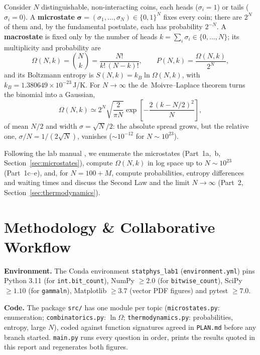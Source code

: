 \documentclass[11pt,a4paper]{article}
\begin{document}
Consider $N$ distinguishable, non-interacting coins, each heads ($\sigma_i=1$) or tails ($\sigma_i=0$). A \textbf{microstate} $\bm{\sigma}=(\sigma_1,\dots,\sigma_N)\in\{0,1\}^N$ fixes every coin; there are $2^N$ of them and, by the fundamental postulate, each has probability $2^{-N}$. A \textbf{macrostate} is fixed only by the number of heads $k=\sum_i\sigma_i\in\{0,\dots,N\}$; its multiplicity and probability are
\begin{equation}
    \Omega(N,k)=\binom{N}{k}=\frac{N!}{k!\,(N-k)!},\qquad P(N,k)=\frac{\Omega(N,k)}{2^N},
    \label{eq:binomial_multiplicity}
\end{equation}
and its Boltzmann entropy is $S(N,k)=k_B\ln\Omega(N,k)$, with $k_B=1.380649\times10^{-23}$\,J/K. For $N\to\infty$ the de~Moivre--Laplace theorem turns the binomial into a Gaussian,
\begin{equation}
    \Omega(N,k)\simeq2^N\sqrt{\frac{2}{\pi N}}\exp\!\left[-\frac{2\,(k-N/2)^2}{N}\right],
    \label{eq:gaussian_limit}
\end{equation}
of mean $N/2$ and width $\sigma=\sqrt N/2$: the absolute spread grows, but the relative one, $\sigma/N=1/(2\sqrt N)$, vanishes ($\sim10^{-12}$ for $N\sim10^{23}$).

Following the lab manual \cite{tribaldos}, we enumerate the microstates (Part~1a,~b, Section~\ref{sec:microstates}), compute $\Omega(N,k)$ in log space up to $N\sim10^{23}$ (Part~1c--e), and, for $N=100+M$, compute probabilities, entropy differences and waiting times and discuss the Second Law and the limit $N\to\infty$ (Part~2, Section~\ref{sec:thermodynamics}).

\section{Methodology \& Collaborative Workflow}
\label{sec:methodology}

\textbf{Environment.} The Conda environment \texttt{statphys\_lab1} (\texttt{environment.yml}) pins Python 3.11 (for \texttt{int.bit\_count}), NumPy $\ge2.0$ (for \texttt{bitwise\_count}), SciPy $\ge1.10$ (for \texttt{gammaln}), Matplotlib $\ge3.7$ (vector PDF figures) and pytest $\ge7.0$.

\textbf{Code.} The package \texttt{src/} has one module per topic (\texttt{microstates.py}: enumeration; \texttt{combinatorics.py}: $\ln\Omega$; \texttt{thermodynamics.py}: probabilities, entropy, large $N$), coded against function signatures agreed in \texttt{PLAN.md} before any branch started. \texttt{main.py} runs every question in order, prints the results quoted in this report and regenerates both figures.
\end{document}
